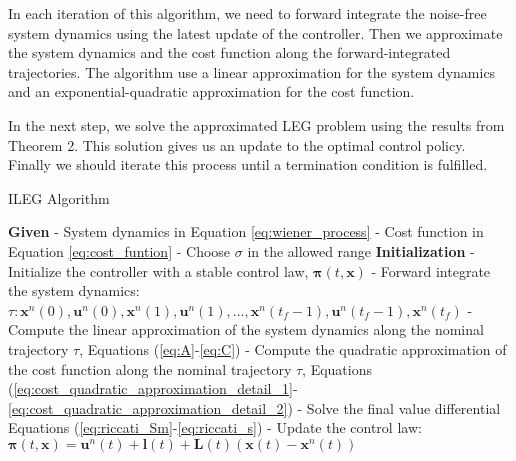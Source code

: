 \documentclass[letterpaper, 10 pt, conference]{ieeeconf}
\newcommand{\vl}{\mathbf l}
\newcommand{\vu}{\mathbf u}
\newcommand{\vx}{\mathbf x}
\newcommand{\vL}{\mathbf L}
\begin{document}
In each iteration of this algorithm, we need to forward integrate the noise-free
system dynamics using the latest update of the controller. Then we approximate
the system dynamics and the cost function along the forward-integrated trajectories. The
algorithm use a linear approximation for the system dynamics and an
exponential-quadratic approximation for the cost function.

In the next step, we solve the approximated LEG problem using the results
from Theorem 2. This solution gives us an update to the optimal control policy.
Finally we should iterate this process until a termination condition is fulfilled.
\begin{algorithm}[tpb]
\caption{ILEG Algorithm}
\label{alg:ileg}
\begin{algorithmic}
\scriptsize 
	\STATE \textbf{Given}
	\STATE - System dynamics in Equation \eqref{eq:wiener_process} 
	\STATE - Cost function in Equation \eqref{eq:cost_funtion}
	\STATE - Choose $\sigma$ in the allowed range
	\STATE \textbf{Initialization}
	\STATE - Initialize the controller with a stable control law, $\mathbf{\pi}(t,\vx)$
	\REPEAT
	\STATE - Forward integrate the system dynamics:
	\STATE $\tau: \vx^n(0),\vu^n(0),\vx^n(1),\vu^n(1),\dots,\vx^n(t_f-1),\vu^n(t_f-1),\vx^n(t_f)$
	\STATE - Compute the linear approximation of the system dynamics along the nominal trajectory $\tau$, Equations\! (\ref{eq:A}-\ref{eq:C})
	\STATE - Compute the quadratic approximation of the cost function along the nominal trajectory $\tau$, Equations\! (\ref{eq:cost_quadratic_approximation_detail_1}-\ref{eq:cost_quadratic_approximation_detail_2}) 
	\STATE - Solve the final value differential Equations\! (\ref{eq:riccati_Sm}-\ref{eq:riccati_s})
	\STATE - Update the control law: $\mathbf{\pi}(t,\vx) = \vu^n(t) + \vl(t) + \vL(t) \left(\vx(t)-\vx^n(t)\right)$
\end{algorithmic}
\end{algorithm} 
\end{document}

